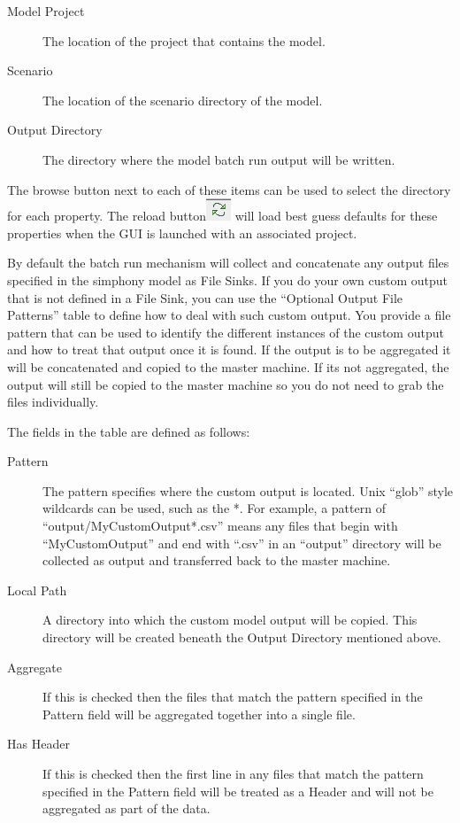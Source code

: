 \documentclass[11pt]{amsart}
\begin{document}
\begin{description}
\item[Model Project] The location of the project that contains the model.
\item[Scenario] The location of the scenario directory of the model.
\item[Output Directory] The directory where the model batch run output will be written.
\end{description}

The browse button next to each of these items can be used to select the directory for each property. The reload button\includegraphics[height=.2in]{images/reload_button.png}  will load best guess defaults for these properties when the GUI is launched with an associated project.

By default the batch run mechanism will collect and concatenate any output files specified in the simphony model as File Sinks. If you do your own custom output that is not defined in a File Sink, you can use the ``Optional Output File Patterns'' table to define how to deal with such custom output. You provide a file pattern that can be used to identify the different instances of the custom output and how to treat that output once it is found. If the output is to be aggregated it will be concatenated and copied to the master machine. If its not aggregated, the output will still be copied to the master machine so you do not need to grab the files individually.

The fields in the table are defined as follows:

\begin{description}
\item[Pattern] The pattern specifies where the custom output is located. Unix ``glob'' style wildcards can be used, such as the *. For example, a pattern of ``output/MyCustomOutput*.csv'' means any files that begin with ``MyCustomOutput'' and end with ``.csv'' in an ``output'' directory will be collected as output and transferred back to the master machine.
\item[Local Path] A directory into which the custom model output will be copied. This directory will be created beneath the Output Directory mentioned above.
\item[Aggregate] If this is checked then the files that match the pattern specified in the Pattern field will be aggregated together into a single file.
\item[Has Header] If this is checked then the first line in any files that match the pattern specified in the Pattern field will be treated as a Header and will not be aggregated as part of the data.
\end{description}
\end{document}

